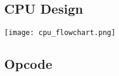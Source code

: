 
\begin{multicols*}{2}
    \section{CPU Design}\label{cpu design}

    \begin{center}
        \texttt{[image: cpu\_flowchart.png]}
    \end{center}
    \subsection{Opcode}

    \begin{footnotesize}
        \renewcommand{\arraystretch}{1.2}
        \setlength{\oldtabcolsep}{\tabcolsep}\setlength\tabcolsep{6pt}


\end{footnotesize}
\end{multicols*}
